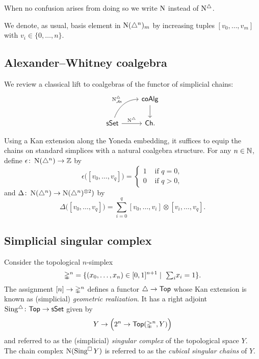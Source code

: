 When no confusion arises from doing so we write $\operatorname{N}$ instead of $\operatorname{N^{\triangle}}$.

We denote, as usual, basis element in $\operatorname{N}(\triangle^n)_m$ by increasing tuples $[v_0, \dots, v_m]$ with $v_i \in \{0, \dots, n\}$.

\subsection{Alexander--Whitney coalgebra} \label{ss:aw coalgebra}

We review a classical lift to coalgebras of the functor of simplicial chains:
\begin{equation*}
\begin{tikzcd}
& \coAlg \arrow[d] \\
\sSet \arrow[r, "\schains"] \arrow[ur, "\schainsAS", out=70, in=180] & \Ch.
\end{tikzcd}
\end{equation*}

Using a Kan extension along the Yoneda embedding, it suffices to equip the chains on standard simplices with a natural coalgebra structure.
For any $n \in \mathbb{N}$, define $\epsilon  \colon \operatorname{N}(\triangle^n) \to \mathbb{Z}$ by
\begin{equation*}
\epsilon \big( [v_0, \dots, v_q] \big) = \begin{cases} 1 & \text{ if } q = 0, \\ 0 & \text{ if } q>0, \end{cases}
\end{equation*}
and $\Delta \colon \operatorname{N}(\triangle^n) \to \operatorname{N}(\triangle^n)^{\otimes2})$ by
\begin{equation*}
\Delta \big( [v_0, \dots, v_q] \big) = \sum_{i=0}^q [v_0, \dots, v_i] \otimes [v_i, \dots, v_q].
\end{equation*}

\subsection{Simplicial singular complex}

Consider the topological $n$-simplex
\begin{equation*}
\mathbb{\Delta}^{n} = \{(x_0, \dots, x_n) \in [0,1]^{n+1} \mid \ \textstyle{\sum}_i x_i = 1\}.
\end{equation*}
The assignment $[n] \to \mathbb{\Delta}^n$ defines a functor $\triangle \to \mathsf{Top}$ whose Kan extension is known as (simplicial) \textit{geometric realization}.
It has a right adjoint $\operatorname{Sing^{\triangle}} \colon \mathsf{Top} \to \mathsf{sSet}$ given by
\begin{equation*}
Y \to \Big( 2^n \to \mathsf{Top}(\mathbb{\Delta}^n, Y) \Big)
\end{equation*}
and referred to as the (simplicial) \textit{singular complex} of the topological space $Y$.
The chain complex $\operatorname{N}(\operatorname{Sing^{\square}} Y)$ is referred to as the \textit{cubical singular chains} of $Y$.


